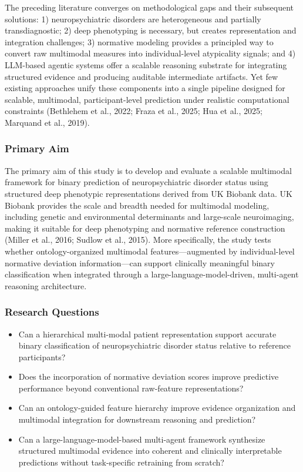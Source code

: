 \documentclass[11pt,a4paper,twoside]{article}
\begin{document}
The preceding literature converges on methodological gaps and their subsequent solutions: 1) neuropsychiatric disorders are heterogeneous and partially transdiagnostic; 2) deep phenotyping is necessary, but creates representation and integration challenges; 3) normative modeling provides a principled way to convert raw multimodal measures into individual-level atypicality signals; and 4) LLM-based agentic systems offer a scalable reasoning substrate for integrating structured evidence and producing auditable intermediate artifacts. Yet few existing approaches unify these components into a single pipeline designed for scalable, multimodal, participant-level prediction under realistic computational constraints (Bethlehem et al., 2022; Fraza et al., 2025; Hua et al., 2025; Marquand et al., 2019).

\subsubsection{Primary Aim}

The primary aim of this study is to develop and evaluate a scalable multimodal framework for binary prediction of neuropsychiatric disorder status using structured deep phenotypic representations derived from UK Biobank data. UK Biobank provides the scale and breadth needed for multimodal modeling, including genetic and environmental determinants and large-scale neuroimaging, making it suitable for deep phenotyping and normative reference construction (Miller et al., 2016; Sudlow et al., 2015). More specifically, the study tests whether ontology-organized multimodal features---augmented by individual-level normative deviation information---can support clinically meaningful binary classification when integrated through a large-language-model-driven, multi-agent reasoning architecture.

\subsubsection{Research Questions}

\begin{itemize}[nosep]
  \item Can a hierarchical multi-modal patient representation support accurate binary classification of neuropsychiatric disorder status relative to reference participants?
  \item Does the incorporation of normative deviation scores improve predictive performance beyond conventional raw-feature representations?
  \item Can an ontology-guided feature hierarchy improve evidence organization and multimodal integration for downstream reasoning and prediction?
  \item Can a large-language-model-based multi-agent framework synthesize structured multimodal evidence into coherent and clinically interpretable predictions without task-specific retraining from scratch?
\end{itemize}
\end{document}

